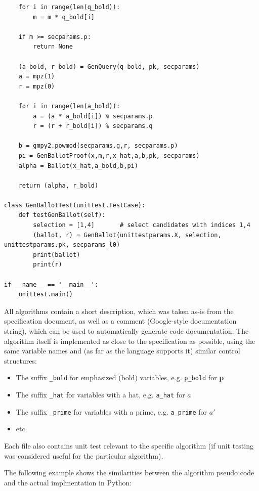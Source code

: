 \begin{verbatim}
    for i in range(len(q_bold)):
        m = m * q_bold[i]

    if m >= secparams.p:
        return None

    (a_bold, r_bold) = GenQuery(q_bold, pk, secparams)
    a = mpz(1)
    r = mpz(0)

    for i in range(len(a_bold)):
        a = (a * a_bold[i]) % secparams.p
        r = (r + r_bold[i]) % secparams.q

    b = gmpy2.powmod(secparams.g,r, secparams.p)
    pi = GenBallotProof(x,m,r,x_hat,a,b,pk, secparams)
    alpha = Ballot(x_hat,a_bold,b,pi)

    return (alpha, r_bold)

class GenBallotTest(unittest.TestCase):
    def testGenBallot(self):
        selection = [1,4]       # select candidates with indices 1,4
        (ballot, r) = GenBallot(unittestparams.X, selection, unittestparams.pk, secparams_l0)
        print(ballot)
        print(r)

if __name__ == '__main__':
    unittest.main()
\end{verbatim}

All algorithms contain a short description, which was taken as-is from the specification document, as well as a comment (Google-style documentation string), which can be used to automatically generate code documentation. The algorithm itself is implemented as close to the specification as possible, using the same variable names and (as far as the language supports it) similar control structures:

\begin{itemize}
	\item The suffix \texttt{\_bold} for emphasized (bold) variables, e.g. \texttt{p\_bold} for \textbf{p}
	\item The suffix \texttt{\_hat} for variables with a hat, e.g. \texttt{a\_hat} for $\hat{a}$
	\item The suffix \texttt{\_prime} for variables with a prime, e.g. \texttt{a\_prime} for $a'$
	\item etc.
\end{itemize}

Each file also contains unit test relevant to the specific algorithm (if unit testing was considered useful for the particular algorithm).

The following example shows the similarities between the algorithm pseudo code and the actual implmentation in Python:

